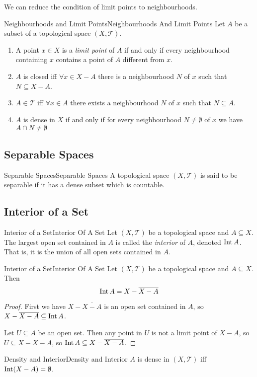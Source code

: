 \documentclass[../main.tex]{subfiles}
\begin{document}
We can reduce the condition of limit points to neighbourhoods.
\begin{proposition}{Neighbourhoods and Limit Points}{Neighbourhoods And Limit Points}
Let $A$ be a subset of a topological space $(X,\mathcal{T})$.
\begin{enumerate}
\item A point $x\in X$ is a \emph{limit point} of $A$ if and only if every neighbourhood containing $x$ contains a point of $A$ different from $x$.
\item $A$ is closed iff $\forall x\in X-A$ there is a neighbourhood $N$ of $x$ such that $N \subseteq X-A$.
\item $A\in \mathcal{T}$ iff $\forall x\in A$ there exists a neighbourhood $N$ of  $x$ such that $N \subseteq A$.
\item $A$ is dense in $X$ if and only if for every neighbourhood $N\neq \emptyset $ of $x$ we have $A\cap N \neq \emptyset $
\end{enumerate}
\end{proposition}

\subsection{Separable Spaces}
\begin{definition}{Separable Spaces}{Separable Spaces}
A topological space $(X,\mathcal{T})$ is said to be separable if it has a dense subset which is countable.
\end{definition}

\subsection{Interior of a Set}
\begin{definition}{Interior of a Set}{Interior Of A Set}
Let $(X,\mathcal{T})$ be a topological space and $A \subseteq X$. The largest open set contained in $A$ is called the \emph{interior} of $A$, denoted $\operatorname{Int} A$. That is, it is the union of all open sets contained in $A$.
\end{definition}

\begin{theorem}{Interior of a Set}{Interior Of A Set}
Let $(X,\mathcal{T})$ be a topological space and $A \subseteq X$. Then
\begin{equation*}
\operatorname{Int} A = X - \overline{X-A}
\end{equation*}
\end{theorem}
\begin{proof}
First we have $X-\overline{X-A}$ is an open set contained in $A$, so $X-\overline{X-A} \subseteq \operatorname{Int} A$.

Let $U \subseteq A$ be an open set. Then any point in $U$ is not a limit point of $X-A$, so $U \subseteq X-\overline{X-A}$, so $\operatorname{Int} A \subseteq X-\overline{X-A}$.
\end{proof}
\begin{corollary}{Density and Interior}{Density and Interior}
$A$ is dense in $(X,\mathcal{T})$ iff $\operatorname{Int} (X-A) = \emptyset $.
\end{corollary}
\end{document}
